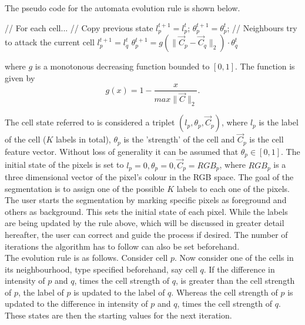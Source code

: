 \documentclass[a4paper,10pt]{article}
\begin{document}
\noindent The pseudo code for the automata evolution rule is shown below. 
\begin{algorithm}[H]
\begin{algorithmic}[1]
 \State // For each cell...
 \State // Copy previous state
 \State $l^{t+1}_{p} = l^{t}_{p}$;
 \State $\theta_{p}^{t+1} = \theta_{p}^{t}$;
 \State // Neighbours try to attack the current cell
 \State $l^{t+1}_{p} = l^{t}_{q}$
 \State $\theta^{t+1}_{p} = g(\| \overrightarrow{C}_{p} - \overrightarrow{C}_{q} \|_{2}) \cdot \theta^{t}_{q}$
 \EndIf
 \EndFor
 \EndFor
\end{algorithmic}
\end{algorithm}

\noindent where $g$ is a monotonous decreasing function bounded to $[0, 1]$.  The function is given by
\[
g(x) = 1 - \frac{x}{max\| \overrightarrow{C} \|_{2}}. 
\]

\noindent The cell state referred to is considered a triplet $(l_{p}, \theta_{p}, \overrightarrow{C}_{p})$, where $l_{p}$ is the label of the cell ($K$ labels in total), $\theta_{p}$ is the 'strength' of the cell and $\overrightarrow{C}_{p}$ is the cell feature vector.  Without loss of generality it can be assumed that $\theta_{p} \in [0,1]$. 
The initial state of the pixels is set to $l_{p} = 0, \theta_{p} = 0, \overrightarrow{C}_{p} = RGB_{p}$, where $RGB_{p}$ is a three dimensional vector of the pixel's colour in 
the RGB space.  The goal of the segmentation is to assign one of the possible $K$ labels to each one of the pixels.  The user starts the segmentation by marking specific pixels as
foreground and others as background.  This sets the initial state of each pixel.  While the labels are being updated by the rule above, which will be discussed in greater detail hereafter, the user can correct and guide the process if desired.  The number of iterations the algorithm has to follow can also be set beforehand.  \\

\noindent The evolution rule is as follows.  Consider cell $p$.  Now consider one of the cells in its neighbourhood, type specified beforehand, say cell $q$.  If the difference in intensity of $p$ and $q$, times the cell strength of $q$, is greater than the cell strength of $p$, the label of $p$ is updated to the label of $q$.  Whereas the cell strength of $p$ is updated to the difference in intensity of $p$ and $q$, times the cell strength of $q$.  These states are then the starting values for the next iteration. \\
\end{document}
